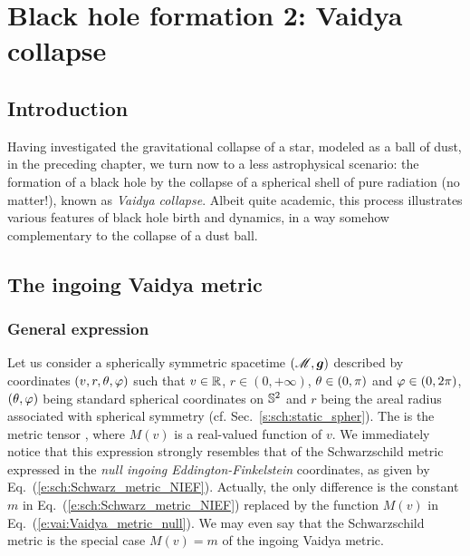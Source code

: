\chapter{Black hole formation 2: Vaidya collapse}
\label{s:vai}

\minitoc

\section{Introduction}

Having investigated the gravitational collapse of a star, modeled as a ball of dust,
in the preceding chapter, we turn now to a less astrophysical scenario: the
formation of a black hole by the collapse of a spherical shell of pure radiation
(no matter!),
known as \emph{Vaidya collapse}. Albeit quite
academic, this process illustrates various features of black hole birth and dynamics,
in a way somehow complementary to the collapse of a dust ball.

\section{The ingoing Vaidya metric}

\subsection{General expression} \label{s:vai:general}

Let us consider a spherically symmetric spacetime $(\mathscr{M},\bm{g})$ described by
coordinates $(v,r,\theta,\varphi)$ such that $v\in \mathbb{R}$, $r\in(0, +\infty)$,
$\theta\in(0,\pi)$ and $\varphi\in(0,2\pi)$, $(\theta,\varphi)$ being standard
spherical coordinates on $\mathbb{S}^2$ and $r$ being the areal radius associated
with spherical symmetry (cf. Sec.~\ref{s:sch:static_spher}).
The 
is the metric tensor
\be \label{e:vai:Vaidya_metric_null}
     ,
\ee
where $M(v)$ is a real-valued function of $v$.
We immediately notice that this expression strongly resembles that
of the Schwarzschild metric expressed in the
\emph{null ingoing Eddington-Finkelstein}
coordinates, as given by Eq.~(\ref{e:sch:Schwarz_metric_NIEF}). Actually, the
only difference is the constant $m$ in Eq.~(\ref{e:sch:Schwarz_metric_NIEF})
replaced by the function $M(v)$ in Eq.~(\ref{e:vai:Vaidya_metric_null}).
We may even say that the Schwarzschild metric is the special case $M(v) = m$ of
the ingoing Vaidya metric.

